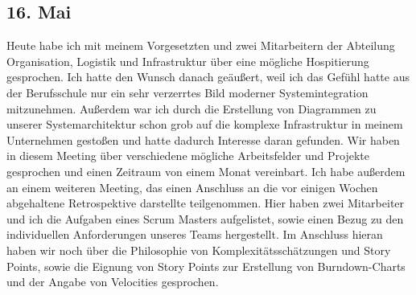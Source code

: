 \subsection{16. Mai}
Heute habe ich mit meinem Vorgesetzten und zwei Mitarbeitern der Abteilung Organisation, Logistik und Infrastruktur über eine mögliche Hospitierung gesprochen. Ich hatte den Wunsch danach geäußert, weil ich das Gefühl hatte aus der Berufsschule nur ein sehr verzerrtes Bild moderner Systemintegration mitzunehmen. Außerdem war ich durch die Erstellung von Diagrammen zu unserer Systemarchitektur schon grob auf die komplexe Infrastruktur in meinem Unternehmen gestoßen und hatte dadurch Interesse daran gefunden. Wir haben in diesem Meeting über verschiedene mögliche Arbeitsfelder und Projekte gesprochen und einen Zeitraum von einem Monat vereinbart.
Ich habe außerdem an einem weiteren Meeting, das einen Anschluss an die vor einigen Wochen abgehaltene Retrospektive darstellte teilgenommen. Hier haben zwei Mitarbeiter und ich die Aufgaben eines Scrum Masters aufgelistet, sowie einen Bezug zu den individuellen Anforderungen unseres Teams hergestellt. Im Anschluss hieran haben wir noch über die Philosophie von Komplexitätsschätzungen und Story Points, sowie die Eignung von Story Points zur Erstellung von Burndown-Charts und der Angabe von Velocities gesprochen.